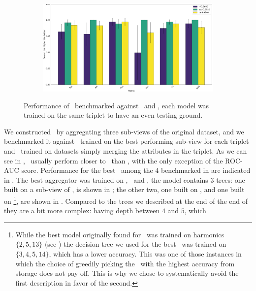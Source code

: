 \begin{figure}[!ht]
\begin{subfigure}{0.49\linewidth}
		\subcaption{\an, \cnmod, \phin}
	\end{subfigure}
	\begin{subfigure}{0.49\linewidth}
		\includegraphics[width=\linewidth]{img/Bn_Cnmod_Phi_ta.png}
		\subcaption{\bn, \cnmod, \phin}
	\end{subfigure}
	\caption{Performance of \tas\ benchmarked against \rfs\ and \svcs, each model was trained on
		the same triplet to have an even testing ground.} \label{fig:triplets-performance}
\end{figure}
We constructed \tas\ by aggregating three sub-views of the original dataset, and we benchmarked it
against \rfs\ trained on the best performing sub-view for each triplet and \svcs\ trained on
datasets simply merging the attributes in the triplet. As we can see in , \tas\ usually perform
closer to \svcs\ than \rfs, with the only exception of the ROC-AUC score. Performance for the best \ta\ among the $4$ benchmarked in  are indicated in . The best aggregator was trained on \an, \bn\ and \cnmod, the model contains $3$ trees: one built
on a sub-view of \an, is shown in ; the other two, one built on \bn, and one
built on \cnmod\footnote{
	While the best model originally found for \cnmod\ was trained on harmonics $\{2, 5, 13\}$
	(see ) the decision tree we used for the best \ta\ was trained on $\{3,
		4, 5, 14\}$, which has a lower accuracy. This was one of those instances in which
	the choice of greedily picking the \dt\ with the highest accuracy from storage does
	not pay off. This is why we chose to systematically avoid the first description in favor of
	the second.
}, are shown in . Compared to the trees we described at the end
of the end of  they are a bit more complex: having depth between $4$ and $5$, which
